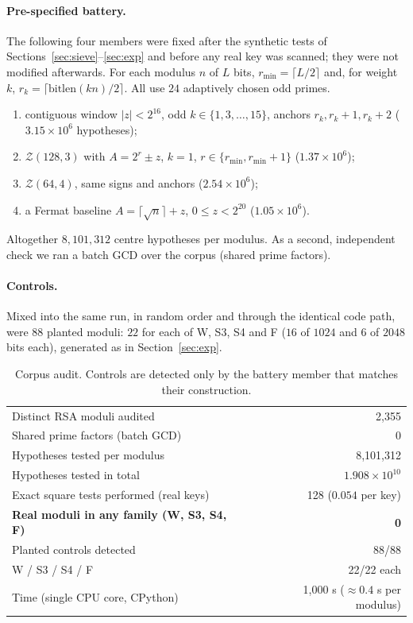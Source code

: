 \documentclass[11pt,a4paper]{article}
\begin{document}
\paragraph{Pre-specified battery.} The following four members were fixed after the synthetic tests of Sections~\ref{sec:sieve}--\ref{sec:exp} and before any real key was scanned; they were not modified afterwards. For each modulus $n$ of $L$ bits, $r_{\min}=\lceil L/2\rceil$ and, for weight $k$, $r_k=\lceil \mathrm{bitlen}(kn)/2\rceil$. All use $24$ adaptively chosen odd primes.
\begin{enumerate}[leftmargin=1.8em,itemsep=1pt]
\item[\textbf{W}] contiguous window $|z|<2^{16}$, odd $k\in\{1,3,\dots,15\}$, anchors $r_k,r_k+1,r_k+2$ ($3.15\times10^6$ hypotheses);
\item[\textbf{S3}] $\mathcal Z(128,3)$ with $A=2^r\pm z$, $k=1$, $r\in\{r_{\min},r_{\min}+1\}$ ($1.37\times10^6$);
\item[\textbf{S4}] $\mathcal Z(64,4)$, same signs and anchors ($2.54\times10^6$);
\item[\textbf{F}] a Fermat baseline $A=\lceil\sqrt n\rceil+z$, $0\le z<2^{20}$ ($1.05\times10^6$).
\end{enumerate}
Altogether $8{,}101{,}312$ centre hypotheses per modulus. As a second, independent check we ran a batch GCD over the corpus (shared prime factors).

\paragraph{Controls.} Mixed into the same run, in random order and through the identical code path, were $88$ planted moduli: $22$ for each of W, S3, S4 and F ($16$ of $1024$ and $6$ of $2048$ bits each), generated as in Section~\ref{sec:exp}.

\begin{table}[ht]\centering\small
\caption{Corpus audit. Controls are detected only by the battery member that matches their construction.}\label{tab:corpus}
\begin{tabular}{@{}lr@{}}\toprule
Distinct RSA moduli audited & 2,355\\
Shared prime factors (batch GCD) & 0\\
Hypotheses tested per modulus & 8,101,312\\
Hypotheses tested in total & $1.908\times10^{10}$\\
Exact square tests performed (real keys) & 128 ($0.054$ per key)\\
\textbf{Real moduli in any family (W, S3, S4, F)} & \textbf{0}\\
Planted controls detected & 88/88\\
\quad W / S3 / S4 / F & 22/22 each\\
Time (single CPU core, CPython) & 1,000 s ($\approx0.4$ s per modulus)\\\bottomrule
\end{tabular}
\end{table}
\end{document}
